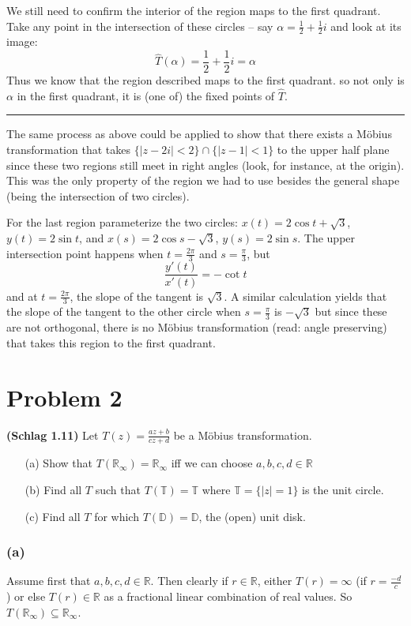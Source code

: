 \documentclass[12pt]{article}
\newcommand*{\R}{
\mathbb{R}
}
\newcommand*{\brk}{
\rule{2in}{.1pt}
}
\begin{document}
	We still need to confirm the interior of the region maps to the first quadrant. Take any point in the intersection of these circles -- say $\alpha=\frac{1}{2}+\frac{1}{2}i$ and look at its image:
	\[\hat T(\alpha)=\frac{1}{2}+\frac{1}{2}i=\alpha\]
	Thus we know that the region described maps to the first quadrant.
	so not only is $\alpha$ in the first quadrant, it is (one of) the fixed points of $\hat T$.
	
	\brk
	
	The same process as above could be applied to show that there exists a M\"obius transformation that takes $\{|z-2i|<2\}\cap\{|z-1|<1\}$ to the upper half plane since these two regions still meet in right angles (look, for instance, at the origin). This was the only property of the region we had to use besides the general shape (being the intersection of two circles).
	
	For the last region parameterize the two circles: $x(t)=2\cos t+\sqrt{3}$, $y(t)=2\sin t$, and $x(s)=2\cos s-\sqrt{3}$, $y(s)=2\sin s$. The upper intersection point happens when $t=\frac{2\pi}{3}$ and $s=\frac{\pi}{3}$, but
	\[\frac{y'(t)}{x'(t)}=-\cot t\]
	and at $t=\frac{2\pi}{3}$, the slope of the tangent is $\sqrt{3}$. A similar calculation yields that the slope of the tangent to the other circle when $s=\frac{\pi}{3}$ is $-\sqrt{3}$ but since these are not orthogonal, there is no M\"obius transformation (read: angle preserving) that takes this region to the first quadrant.

\section*{Problem 2}
	\begin{spacing}{1}
		\textbf{(Schlag 1.11)} Let $T(z)=\frac{az+b}{cz+d}$ be a M\"obius transformation.
		\begin{itemize}
			\item[(a)] Show that $T(\R_\infty)=\R_\infty$ iff we can choose $a,b,c,d\in\R$
			\item[(b)] Find all $T$ such that $T(\mathbb{T})=\mathbb{T}$ where $\mathbb{T}=\{|z|=1\}$ is the unit circle.
			\item[(c)] Find all $T$ for which $T(\mathbb{D})=\mathbb{D}$, the (open) unit disk.
		\end{itemize}
	\end{spacing}	
	\noindent\hrulefill
	
	\subsubsection*{(a)}
		Assume first that $a,b,c,d\in\R$. Then clearly if $r\in \R$, either $T(r)=\infty$ (if $r=\frac{-d}{c}$) or else $T(r)\in\R$ as a fractional linear combination of real values. So $T(\R_\infty)\subseteq\R_\infty$.
		
\end{document}
